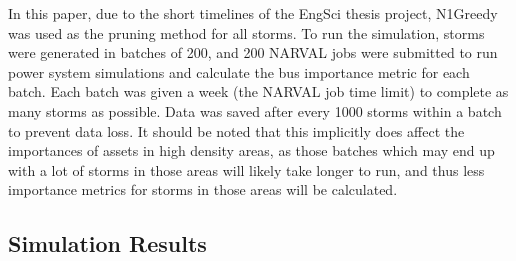 \documentclass[12pt]{article}
\begin{document}
In this paper, due to the short timelines of the EngSci thesis project, N1Greedy was used as the pruning method for all storms. To run the simulation, storms were generated in batches of 200, and 200 NARVAL jobs were submitted to run power system simulations and calculate the bus importance metric for each batch. Each batch was given a week (the NARVAL job time limit) to complete as many storms as possible. Data was saved after every 1000 storms within a batch to prevent data loss. It should be noted that this implicitly does affect the importances of assets in high density areas, as those batches which may end up with a lot of storms in those areas will likely take longer to run, and thus less importance metrics for storms in those areas will be calculated.

\subsection{Simulation Results}



\newpage

\newpage 
\appendix 
\end{document}
